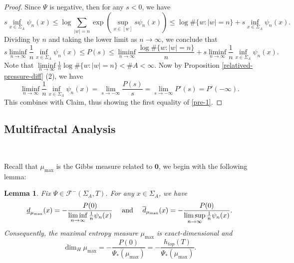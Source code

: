 \documentclass[reqno,11pt,graphicx,]{amsart}
\numberwithin{equation}{section}
\theoremstyle{plain}
\newcommand{\3}{\mathbf{3}}
\newcommand{\mw}{x}
\newtheorem{lemma}[theorem]{Lemma}
\begin{document}
\begin{proof}
		Since $\Psi$ is negative, then for any $s<0$, we have 
		\begin{equation*}
			s\inf_{\mw\in\Sigma_A}\psi_{n}(\mw)\leq\log\sum_{|w|=n}\exp(%
			\sup_{x\in[w]}s\psi_{n}(x))\leq\log\#\{w:|w|=n\}+s\inf_{\mw\in\Sigma_A}\psi_{n}(\mw).
		\end{equation*}
		Dividing by $n$ and taking the lower limit as $n\to\infty$, we conclude that 
		\begin{equation*}
			s\liminf_{n\to\infty}\frac{1}{n}\inf_{\mw\in\Sigma_A}\psi_{n}(\mw)\leq
			P(s)\leq\liminf\limits_{n\to\infty}\frac{\log\#\{w:|w|=n\}}{n}+s\liminf_{n\to\infty}\frac{1}{n}\inf_{\mw\in\Sigma_A}\psi_{n}(\mw).
		\end{equation*}
		Note that $\liminf\limits_{n\to\infty}\frac{1}{n}\log\#\{w:|w|=n\}<\# A<\infty$. Now by Proposition \ref{relatived-pressure-diff} (2), we have 
		\begin{equation*}
			\liminf_{n\to\infty}\frac{1}{n}\inf_{\mw\in\Sigma_A}\psi_{n}(\mw)=\lim\limits_{s\to-\infty}\frac{P(s)}{s}=\lim\limits_{s\to-%
				\infty}P'(s)=P'(-\infty).
		\end{equation*}
		This combines with Claim, thus showing the first equality of \eqref{pre-1}.
	\end{proof}
	\subsection{Multifractal Analysis}\
	
	Recall that $\mu_{\max}$ is the Gibbs measure related to $\mathbf{0}$, we begin with the following lemma:
	\begin{lemma}\label{mu-phi-loc}
		Fix $\Psi\in\mathcal{F}^{-}(\Sigma_{A},T)$.	For any $\mw\in\Sigma_A$, we have
		\begin{equation}\label{MA}
			\underline{d}_{\mu_{\max}}(\mw) =-\frac{P(0)}{%
				\liminf\limits_{n\to\infty}\frac{1}{n}\psi_{n}(\mw)}\ \ \ \ \text{and}\ \ \ \ \overline{d}_{\mu_{\max}}(\mw) =-\frac{P(0)}{\limsup\limits_{n\to\infty}\frac{1}{n}\psi_{n}(\mw)}.
		\end{equation}
		Consequently, the maximal entropy measure $\mu_{\max}$ is exact-dimensional and 
		\begin{equation}\label{dim-mu-phi}
			\dim_H\mu_{\max}=-\frac{P(0)}{\Psi_*(\mu_{\max})}=-\frac{h_{top}(T)}{\Psi_*(\mu_{\max})}.
		\end{equation}
	\end{lemma}
	
\end{document}
